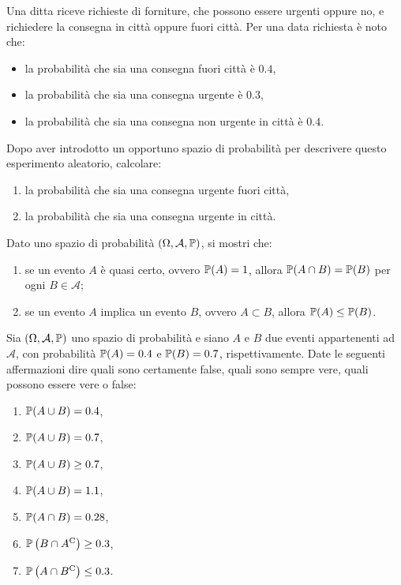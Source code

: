 \Esercizio{}

Una ditta riceve richieste di forniture, che possono essere urgenti oppure no, e richiedere la consegna in città oppure fuori città. Per una data richiesta è noto che:
\begin{itemize}
	\item la probabilità che sia una consegna fuori città è $0.4$,
	\item la probabilità che sia una consegna urgente è $0.3$,
	\item la probabilità che sia una consegna non urgente in città è $0.4$.
\end{itemize}
Dopo aver introdotto un opportuno spazio di probabilità per descrivere questo esperimento aleatorio, calcolare:
\begin{enumerate}
	\item la probabilità che sia una consegna urgente fuori città,
	\item la probabilità che sia una consegna urgente in città.
\end{enumerate}

\Esercizio{}

Dato uno spazio di probabilità $( \Omega ,\mathcal{A} ,\mathbb{P})$, si mostri che:
\begin{enumerate}
	\item se un evento $A$ è quasi certo, ovvero $\mathbb{P}( A) =1$, allora $\mathbb{P}( A\cap B) =\mathbb{P}( B)$ per ogni $B\in \mathcal{A}$;
	\item se un evento $A$ implica un evento $B$, ovvero $A\subset B$, allora $\mathbb{P}( A) \leq \mathbb{P}( B)$.
\end{enumerate}

\Esercizio{}

Sia $( \Omega ,\mathcal{A} ,\mathbb{P})$ uno spazio di probabilità e siano $A$ e $B$ due eventi appartenenti ad $\mathcal{A}$, con probabilità $\mathbb{P}( A) =0.4$ e $\mathbb{P}( B) =0.7$, rispettivamente. Date le seguenti affermazioni dire quali sono certamente false, quali sono sempre vere, quali possono essere vere o false:
\begin{enumerate}
	\item $\mathbb{P}( A\cup B) =0.4$,
	\item $\mathbb{P}( A\cup B) =0.7$,
	\item $\mathbb{P}( A\cup B) \geq 0.7$,
	\item $\mathbb{P}( A\cup B) =1.1$,
	\item $\mathbb{P}( A\cap B) =0.28$,
	\item $\mathbb{P}\left( B\cap A^{\mathrm{C}}\right) \geq 0.3$,
	\item $\mathbb{P}\left( A\cap B^{\mathrm{C}}\right) \leq 0.3$.
\end{enumerate}

